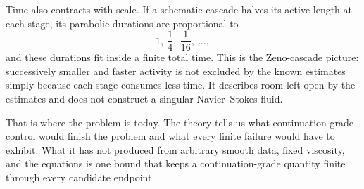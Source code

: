 Time also contracts with scale.
If a schematic cascade halves its active length at each stage, its parabolic durations are proportional to
\[
  1,\ \frac14,\ \frac1{16},\ \ldots,
\]
and these durations fit inside a finite total time.
This is the Zeno-cascade picture: successively smaller and faster activity is not excluded by the known estimates simply because each stage consumes less time.
It describes room left open by the estimates and does not construct a singular Navier--Stokes fluid.

That is where the problem is today.
The theory tells us what continuation-grade control would finish the problem and what every finite failure would have to exhibit.
What it has not produced from arbitrary smooth data, fixed viscosity, and the equations is one bound that keeps a continuation-grade quantity finite through every candidate endpoint.
